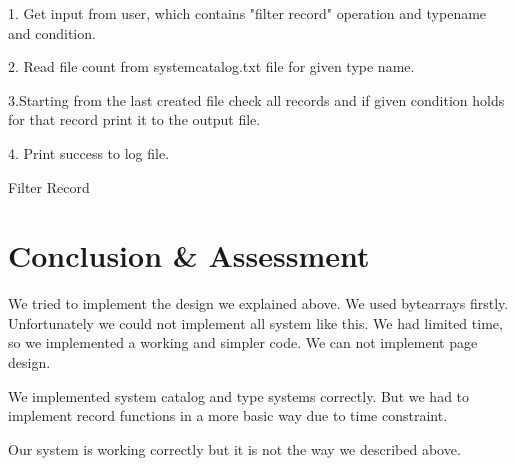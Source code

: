 \documentclass{article}
\begin{document}
\begin{algorithm}[H]
 \item1. Get input from user, which contains "filter record" operation and typename and condition.
 \item2. Read file count from systemcatalog.txt file for given type name.
 \item 3.Starting from the last created file check all records and if given condition holds for that record print it to the output file.
 \item 4. Print success to log file.
\caption{Filter Record}
\end{algorithm}


\section{Conclusion \& Assessment}
\label{sec:conclusion}
We tried to implement the design we explained above. We used bytearrays firstly. Unfortunately we could not implement all system like this. We had limited time, so we implemented a working and simpler code. We can not implement page design. 
\item We implemented system catalog and type systems correctly. But we had to implement record functions in a more basic way due to time constraint.
\item Our system is working correctly but it is not the way we described above.
\end{document}
